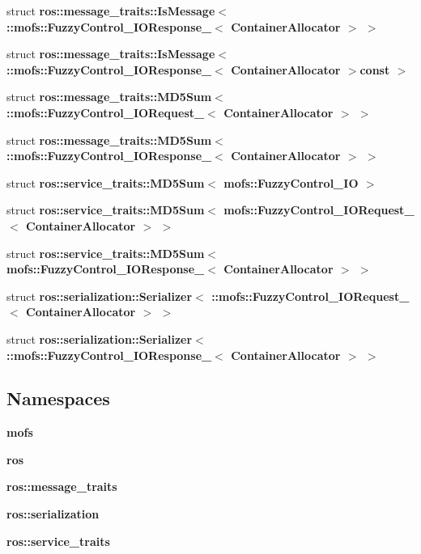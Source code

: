 \begin{DoxyCompactItemize}
\item 
struct {\bf ros\-::message\-\_\-traits\-::\-Is\-Message$<$ \-::mofs\-::\-Fuzzy\-Control\-\_\-\-I\-O\-Response\-\_\-$<$ Container\-Allocator $>$ $>$}
\item 
struct {\bf ros\-::message\-\_\-traits\-::\-Is\-Message$<$ \-::mofs\-::\-Fuzzy\-Control\-\_\-\-I\-O\-Response\-\_\-$<$ Container\-Allocator $>$const  $>$}
\item 
struct {\bf ros\-::message\-\_\-traits\-::\-M\-D5\-Sum$<$ \-::mofs\-::\-Fuzzy\-Control\-\_\-\-I\-O\-Request\-\_\-$<$ Container\-Allocator $>$ $>$}
\item 
struct {\bf ros\-::message\-\_\-traits\-::\-M\-D5\-Sum$<$ \-::mofs\-::\-Fuzzy\-Control\-\_\-\-I\-O\-Response\-\_\-$<$ Container\-Allocator $>$ $>$}
\item 
struct {\bf ros\-::service\-\_\-traits\-::\-M\-D5\-Sum$<$ mofs\-::\-Fuzzy\-Control\-\_\-\-I\-O $>$}
\item 
struct {\bf ros\-::service\-\_\-traits\-::\-M\-D5\-Sum$<$ mofs\-::\-Fuzzy\-Control\-\_\-\-I\-O\-Request\-\_\-$<$ Container\-Allocator $>$ $>$}
\item 
struct {\bf ros\-::service\-\_\-traits\-::\-M\-D5\-Sum$<$ mofs\-::\-Fuzzy\-Control\-\_\-\-I\-O\-Response\-\_\-$<$ Container\-Allocator $>$ $>$}
\item 
struct {\bf ros\-::serialization\-::\-Serializer$<$ \-::mofs\-::\-Fuzzy\-Control\-\_\-\-I\-O\-Request\-\_\-$<$ Container\-Allocator $>$ $>$}
\item 
struct {\bf ros\-::serialization\-::\-Serializer$<$ \-::mofs\-::\-Fuzzy\-Control\-\_\-\-I\-O\-Response\-\_\-$<$ Container\-Allocator $>$ $>$}
\end{DoxyCompactItemize}
\subsection*{Namespaces}
\begin{DoxyCompactItemize}
\item 
{\bf mofs}
\item 
{\bf ros}
\item 
{\bf ros\-::message\-\_\-traits}
\item 
{\bf ros\-::serialization}
\item 
{\bf ros\-::service\-\_\-traits}
\end{DoxyCompactItemize}
